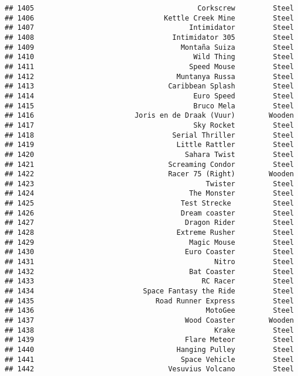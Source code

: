 \documentclass[
]{article}
\begin{document}
\begin{verbatim}
## 1405                                       Corkscrew         Steel
## 1406                               Kettle Creek Mine         Steel
## 1407                                     Intimidator         Steel
## 1408                                 Intimidator 305         Steel
## 1409                                   Montaña Suiza         Steel
## 1410                                      Wild Thing         Steel
## 1411                                     Speed Mouse         Steel
## 1412                                  Muntanya Russa         Steel
## 1413                                Caribbean Splash         Steel
## 1414                                      Euro Speed         Steel
## 1415                                      Bruco Mela         Steel
## 1416                        Joris en de Draak (Vuur)        Wooden
## 1417                                      Sky Rocket         Steel
## 1418                                 Serial Thriller         Steel
## 1419                                  Little Rattler         Steel
## 1420                                    Sahara Twist         Steel
## 1421                                Screaming Condor         Steel
## 1422                                Racer 75 (Right)        Wooden
## 1423                                         Twister         Steel
## 1424                                     The Monster         Steel
## 1425                                   Test Strecke          Steel
## 1426                                   Dream coaster         Steel
## 1427                                    Dragon Rider         Steel
## 1428                                  Extreme Rusher         Steel
## 1429                                     Magic Mouse         Steel
## 1430                                    Euro Coaster         Steel
## 1431                                           Nitro         Steel
## 1432                                     Bat Coaster         Steel
## 1433                                        RC Racer         Steel
## 1434                          Space Fantasy the Ride         Steel
## 1435                             Road Runner Express         Steel
## 1436                                         MotoGee         Steel
## 1437                                    Wood Coaster        Wooden
## 1438                                           Krake         Steel
## 1439                                    Flare Meteor         Steel
## 1440                                  Hanging Pulley         Steel
## 1441                                   Space Vehicle         Steel
## 1442                                Vesuvius Volcano         Steel

\end{verbatim}
\end{document}
